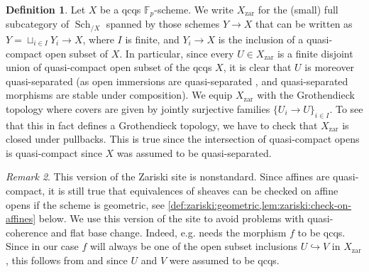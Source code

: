 \documentclass{article}
\theoremstyle{definition}
\newtheorem{defn}{Definition}[section]
\theoremstyle{definition}
\theoremstyle{definition}
\theoremstyle{plain}
\theoremstyle{plain}
\theoremstyle{plain}
\theoremstyle{plain}
\theoremstyle{plain}
\theoremstyle{plain}
\theoremstyle{plain}
\theoremstyle{plain}
\theoremstyle{remark}
\newtheorem{rmk}[defn]{Remark}
\theoremstyle{remark}
\theoremstyle{plain}
\theoremstyle{plain}
\theoremstyle{plain}
\theoremstyle{plain}
\theoremstyle{plain}
\newcommand{\Fp}{\mathbb{F}_p}
\newcommand{\zar}{\operatorname{zar}}
\begin{document}
\begin{defn} \label{defn:zariski:site}
    Let $X$ be a qcqs $\Fp$-scheme.
    We write $X_{\zar}$ for the (small) full subcategory of $\operatorname{Sch}_{/X}$ 
    spanned by those schemes $Y \to X$ that can be written as 
    $Y = \sqcup_{i \in I} Y_i \to X$, where $I$ is finite,
    and $Y_i \to X$ is the inclusion of a quasi-compact open subset of $X$.
    In particular, since every $U \in X_{\zar}$ is a finite disjoint union of quasi-compact open subset of the qcqs $X$, it is clear that 
    $U$ is moreover quasi-separated (as open immersions are quasi-separated \cite[\href{https://stacks.math.columbia.edu/tag/01L7}{Tag 01L7}]{stacks-project},
    and quasi-separated morphisms are stable under composition).
    We equip $X_{\zar}$ with the Grothendieck topology where covers are 
    given by jointly surjective families $\{ U_i \to U\}_{i \in I}$.
    To see that this in fact defines a Grothendieck topology, we have to check that $X_{\zar}$
    is closed under pullbacks. This is true since the intersection of quasi-compact 
    opens is quasi-compact since $X$ was assumed to be quasi-separated.
\end{defn}

\begin{rmk} \label{rmk:zariski:qcqs-of-transition-maps}
    This version of the Zariski site is nonstandard.
    Since affines are quasi-compact,
    it is still true that equivalences of sheaves can be checked on affine opens if the scheme is geometric, see \cref{def:zariski:geometric,lem:zariski:check-on-affines} below.
    We use this version of the site to avoid problems with quasi-coherence and flat base change.
    Indeed, e.g. \cite[\href{https://stacks.math.columbia.edu/tag/02KH}{Tag 02KH}]{stacks-project} 
    needs the morphism $f$ to be qcqs.
    Since in our case $f$ will always be one of the open subset inclusions $U \hookrightarrow V$ 
    in $X_{\zar}$, this follows from 
    \cite[\href{https://stacks.math.columbia.edu/tag/01KV}{Tag 01KV}]{stacks-project} and 
    \cite[\href{https://stacks.math.columbia.edu/tag/03GI}{Tag 03GI}]{stacks-project} 
    since $U$ and $V$ were assumed to be qcqs.
\end{rmk}
\end{document}
